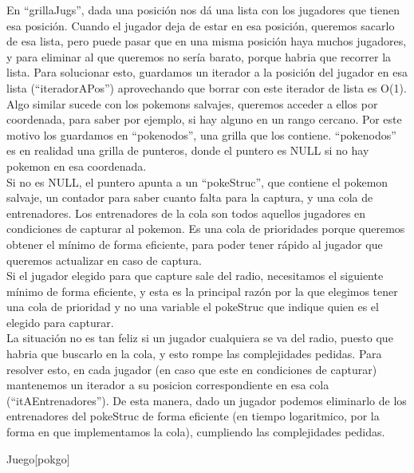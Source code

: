 \begin{Representacion}
En ``grillaJugs'', dada una posici\'on nos d\'a una lista con los jugadores que tienen esa posici\'on. Cuando el jugador deja de estar en esa posici\'on, queremos sacarlo de esa lista, pero puede pasar que en una misma posici\'on haya muchos jugadores, y para eliminar al que queremos no ser\'ia barato, porque habria que recorrer la lista. Para solucionar esto, guardamos un iterador a la posici\'on del jugador en esa lista (``iteradorAPos'') aprovechando que borrar con este iterador de lista es O(1). \\

Algo similar sucede con los pokemons salvajes, queremos acceder a ellos por coordenada, para saber por ejemplo, si hay alguno en un rango cercano. Por este motivo los guardamos en ``pokenodos'', una grilla que los contiene. ``pokenodos'' es en realidad una grilla de punteros, donde el puntero es NULL si no hay pokemon en esa coordenada.\\
Si no es NULL, el puntero apunta a un ``pokeStruc'', que contiene el pokemon salvaje, un contador para saber cuanto falta para la captura, y una cola de entrenadores. Los entrenadores de la cola son todos aquellos jugadores en condiciones de capturar al pokemon. Es una cola de prioridades porque queremos obtener el m\'inimo de forma eficiente, para poder tener r\'apido al jugador que queremos actualizar en caso de captura. \\

Si el jugador elegido para que capture sale del radio, necesitamos el siguiente m\'inimo de forma eficiente, y esta es la principal raz\'on por la que elegimos tener una cola de prioridad y no una variable el pokeStruc que indique quien es el elegido para capturar. \\

La situaci\'on no es tan feliz si un jugador cualquiera se va del radio, puesto que habria que buscarlo en la cola, y esto rompe las complejidades pedidas. Para resolver esto, en cada jugador (en caso que este en condiciones de capturar) mantenemos un iterador a su posicion correspondiente en esa cola (``itAEntrenadores''). De esta manera, dado un jugador podemos eliminarlo de los entrenadores del pokeStruc de forma eficiente (en tiempo logaritmico, por la forma en que implementamos la cola), cumpliendo las complejidades pedidas.\\


\begin{Estructura}{Juego}[pokgo]


\end{Estructura}
\end{Representacion}
